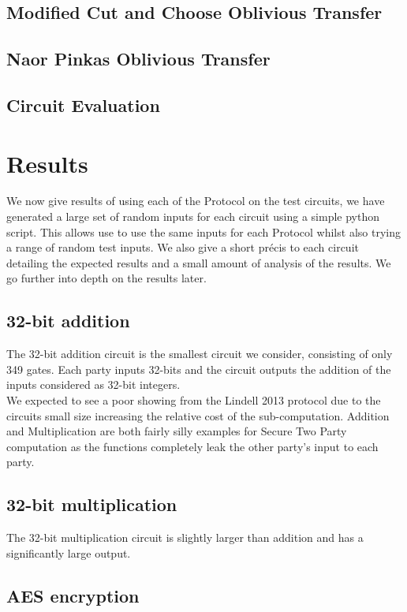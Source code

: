 \documentclass[ %
                    author={Nicholas Tutte},
                supervisor={Prof. Nigel Smart},
                    degree={MEng},
                     title={Secure Two Party Computation},
                  subtitle={A practical comparison of recent protocols},
                      type={Research - GG1K},
                      year={2015} ]{dissertation}
\begin{document}
			\subsection{Modified Cut and Choose Oblivious Transfer}

			\subsection{Naor Pinkas Oblivious Transfer}

			\subsection{Circuit Evaluation}

		\section{Results}
			We now give results of using each of the Protocol on the test circuits, we have generated a large set of random inputs for each circuit using a simple python script. This allows use to use the same inputs for each Protocol whilst also trying a range of random test inputs. We also give a short précis to each circuit detailing the expected results and a small amount of analysis of the results. We go further into depth on the results later.

			\subsection{32-bit addition}
				The 32-bit addition circuit is the smallest circuit we consider, consisting of only 349 gates. Each party inputs 32-bits and the circuit outputs the addition of the inputs considered as 32-bit integers.\\

				We expected to see a poor showing from the Lindell 2013 protocol due to the circuits small size increasing the relative cost of the sub-computation. Addition and Multiplication are both fairly silly examples for Secure Two Party computation as the functions completely leak the other party's input to each party. 

			\subsection{32-bit multiplication}

				The 32-bit multiplication circuit is slightly larger than addition and has a significantly large output.
			\subsection{AES encryption}
\end{document}
